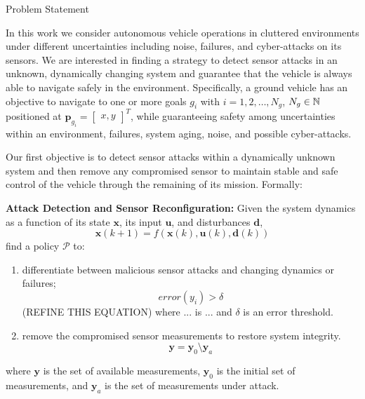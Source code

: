 \begin{section}{Problem Statement}
	
\label{sec:problem}

In this work we consider autonomous vehicle operations in cluttered environments under different uncertainties including noise, failures, and cyber-attacks on its sensors. 
We are interested in finding a strategy to detect sensor attacks in an unknown, dynamically changing system and guarantee that the vehicle is always able to navigate safely in the environment. Specifically, a ground vehicle has an objective to navigate to one or more goals $g_i$ with $ i = 1, 2, \dots, N_g$, $N_g \in \mathbb{N}$ positioned at $\bm{p}_{g_i}={\begin{bmatrix} x,y \end{bmatrix}}^T$, while guaranteeing safety among uncertainties within an environment, failures, system aging, noise, and possible cyber-attacks.



Our first objective is to detect sensor attacks within a dynamically unknown system and then remove any compromised sensor to maintain stable and safe control of the vehicle through the remaining of its mission. Formally:

\begin{problem} 
\label{problem1} {\textbf{Attack Detection and Sensor Reconfiguration:}} 
 Given the system dynamics as a function of its state $ \bm{x} $, its input $ \bm{u}$, and disturbances $ \bm{d} $,
	\begin{equation}
		\bm{x}(k+1) = f(\bm{x}(k), \bm{u}(k), \bm{d}(k))
	\end{equation}
find a policy $\mathcal{P}$ to:
\begin{enumerate}
	\item differentiate between malicious sensor attacks and changing dynamics or failures; 
	\begin{equation}
	\label{eq:detect_attack}
	    error(y_i) > \delta
	\end{equation}
	(REFINE THIS EQUATION)
	where ... is ... and $\delta$ is an error threshold.
	\item remove the compromised sensor measurements to restore system integrity.
	\begin{equation}
	\label{eq:remove_sensors}
	    \bm{y}=\bm{y}_0 \setminus \bm{y}_a
	\end{equation}
\end{enumerate}
where $\bm{y}$ is the set of available measurements, $\bm{y}_0$ is the initial set of measurements, and $\bm{y}_a$ is the set of measurements under attack.



\end{problem}
\end{section}
